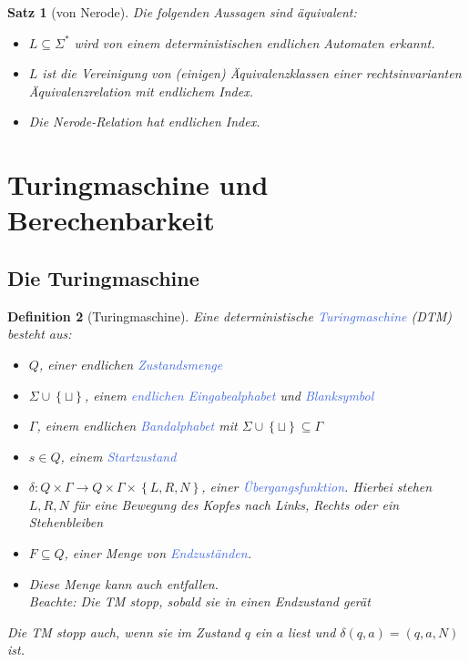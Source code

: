 \documentclass[11pt]{scrartcl}
\newcommand{\tcol}[1]{\textcolor{RoyalBlue}{#1}}
\newcommand{\set}[1]{\left\lbrace #1\right\rbrace}
\theoremstyle{break}
\newtheorem{satz}{Satz}[section]
\newtheorem{defi}[satz]{Definition}
\begin{document}
    \begin{satz}[von Nerode]
        Die folgenden Aussagen sind äquivalent:
        \begin{itemize}
            \item $L\subseteq\Sigma^*$ wird von einem deterministischen endlichen Automaten erkannt.
            \item $L$ ist die Vereinigung von (einigen) Äquivalenzklassen einer rechtsinvarianten Äquivalenzrelation mit endlichem Index.
            \item Die Nerode-Relation hat endlichen Index.
        \end{itemize}
    \end{satz}



    \section{Turingmaschine und Berechenbarkeit}
	\label{sec:turingmaschine-und-berechenbarkeit}


    \subsection{Die Turingmaschine}
	\label{subsec:die-turingmaschine}

    \begin{defi}[Turingmaschine]
        Eine deterministische \tcol{Turingmaschine} (DTM) besteht aus:
        \begin{itemize}
            \item $Q$, einer endlichen \tcol{Zustandsmenge}
            \item $\Sigma\cup\set{\sqcup}$, einem \tcol{endlichen Eingabealphabet} und \tcol{Blanksymbol}
            \item $\Gamma$, einem endlichen \tcol{Bandalphabet} mit $\Sigma\cup\set{\sqcup}\subseteq\Gamma$
            \item $s\in Q$, einem \tcol{Startzustand}
            \item $\delta\colon Q\times\Gamma\to Q\times \Gamma\times\set{L,R,N}$, einer \tcol{Übergangsfunktion}.
                Hierbei stehen $L,R,N$ für eine Bewegung des Kopfes nach Links, Rechts oder ein Stehenbleiben
            \item $F\subseteq Q$, einer Menge von \tcol{Endzuständen}.
            \item Diese Menge kann auch entfallen.\\
            Beachte: Die TM stopp, sobald sie in einen Endzustand gerät
        \end{itemize}
        Die TM stopp auch, wenn sie im Zustand $q$ ein $a$ liest und $\delta(q,a)=(q,a,N)$ ist.
    \end{defi}
\end{document}
